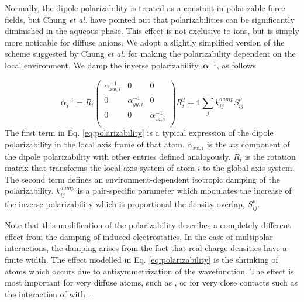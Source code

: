 \documentclass[journal=jctcce,manuscript=article]{achemso}
\begin{document}
Normally, the dipole polarizability is treated as a constant in polarizable force fields,
but Chung \textit{et al.} have pointed out that polarizabilities
can be significantly diminished in the aqueous phase.\cite{chung2022classical}
This effect is not exclusive to ions, but is simply more noticable for diffuse anions. We adopt a slightly
simplified version of the scheme suggested by Chung \textit{et al.} for making the polarizability dependent on the local
environment. We damp the inverse polarizability, $\bm{\alpha}^{-1}$, as follows

\begin{equation}
  \bm{\alpha}^{-1}_i=
  R_i\begin{pmatrix}
    \alpha^{-1}_{xx,i} & 0 & 0 \\
    0 & \alpha^{-1}_{yy,i} & 0 \\
    0 & 0 & \alpha^{-1}_{zz,i} \\
  \end{pmatrix}R_i^T
    +\mathds{1}\sum_{j}k^{damp}_{ij}S_{ij}^\rho
    \label{eq:polarizability}
\end{equation}
\noindent
The first term in Eq. \ref{eq:polarizability} is a typical expression of the dipole polarizability
in the local axis frame of that atom. $\alpha_{xx,i}$ is the $xx$ component of the dipole polarizability
with other entries defined analogously. $R_i$ is the rotation matrix that transforms the local
axis system of atom $i$ to the global axis system. The second term defines an environment-dependent
isotropic damping of the polarizability.
$k_{ij}^{damp}$ is a pair-specific parameter which modulates the increase of the inverse polarizability
which is proportional the density overlap, $S_{ij}^\rho$.

Note that this modification of the polarizability describes a completely different
effect from the damping of induced electrostatics. In the case of multipolar interactions,
the damping arises from the fact that real charge densities have a finite width. The effect
modelled in Eq. \ref{eq:polarizability} is the shrinking of atoms which occurs due to
antisymmetrization of the wavefunction. The effect is most important for very diffuse atoms, such as , or for very close contacts such as the interaction of  with .

\end{document}
